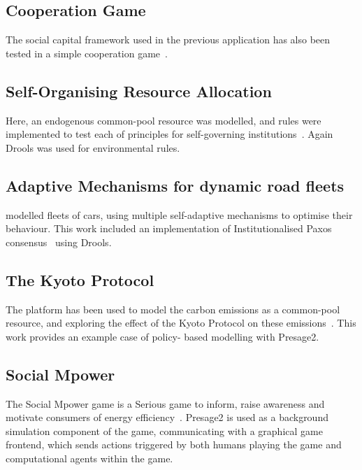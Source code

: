\subsection{Cooperation Game}

The social capital framework used in the previous application has also been
tested in a simple cooperation game~\citep{Petruzzi2014}.

\subsection{Self-Organising Resource Allocation}

Here, an endogenous common-pool resource was modelled, and rules were
implemented to test each of  principles for
self-governing institutions~\citep{Schaumeier2013}. Again Drools was used for
environmental rules.

\subsection{Adaptive Mechanisms for dynamic road fleets}

\citet{Sanderson2013} modelled fleets of cars, using multiple self-adaptive
mechanisms to optimise their behaviour. This work included an implementation
of Institutionalised Paxos consensus~\citep{Sanderson2012} using Drools.

\subsection{The Kyoto Protocol}

The platform has been used to model the carbon emissions as a common-pool
resource, and exploring the effect of the Kyoto Protocol on these
emissions~\citep{Macbeth2014}. This work provides an example case of policy-
based modelling with Presage2.

\subsection{Social Mpower}

The Social Mpower game is a Serious game to inform, raise awareness and motivate
consumers of energy efficiency~\citep{Bourazeri2014}. Presage2 is used as a
background simulation component of the game, communicating with a graphical game
frontend, which sends actions triggered by both humans playing the game and
computational agents within the game.

